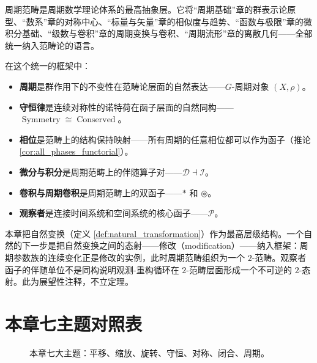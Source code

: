 \begin{remark}[周期范畴在全书中的枢纽地位]\label{rem:periodic_category_hub}
周期范畴是周期数学理论体系的最高抽象层。它将“周期基础”章的群表示论原型、“数系”章的对称中心、“标量与矢量”章的相似度与趋势、“函数与极限”章的微积分基础、“级数与卷积”章的周期变换与卷积、“周期流形”章的离散几何——全部统一纳入范畴论的语言。

在这个统一的框架中：
\begin{itemize}
    \item \textbf{周期}是群作用下的不变性在范畴论层面的自然表达——$G$-周期对象 $(X, \rho)$。
    \item \textbf{守恒律}是连续对称性的诺特荷在函子层面的自然同构——\\$\operatorname{Symmetry} \cong \operatorname{Conserved}$。
    \item \textbf{相位}是范畴上的结构保持映射——所有周期的任意相位都可以作为函子（推论 \ref{cor:all_phases_functorial}）。
    \item \textbf{微分与积分}是周期范畴上的伴随算子对——$\mathcal{D} \dashv \mathcal{I}$。
    \item \textbf{卷积与周期卷积}是周期范畴上的双函子——$*$ 和 $\circledast$。
    \item \textbf{观察者}是连接时间系统和空间系统的核心函子——$\mathcal{P}$。
\end{itemize}
\end{remark}

\begin{remark}[高阶范畴展望]\label{ch13_higher_category_remark}
本章把自然变换（定义 \ref{def:natural_transformation}）作为最高层级结构。一个自然的下一步是把自然变换之间的态射——修改（modification）——纳入框架：周期参数族的连续变化正是修改的实例，此时周期范畴组织为一个 $2$-范畴。观察者函子的伴随单位不是同构说明观测-重构循环在 $2$-范畴层面形成一个不可逆的 $2$-态射。此为展望性注释，不立定理。
\end{remark}

\section*{本章七主题对照表}

\begin{figure}[htbp]
\centering
{}
\caption{本章七大主题：平移、缩放、旋转、守恒、对称、闭合、周期。}
\label{fig:periodic_category_themes}
\end{figure}

